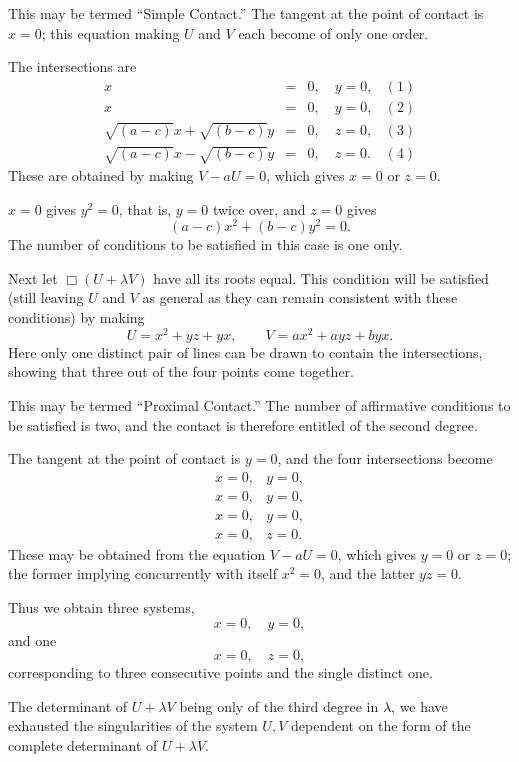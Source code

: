 \documentclass[11pt]{article}
\newcommand{\sourcepage}[1]{\marginpar{\scriptsize p.~#1}}
\begin{document}
{{\sourcepage{224}
This may be termed ``Simple Contact.'' The tangent at the point of contact is $x=0$; this equation making $U$ and $V$ each become of only one order.

The intersections are
\[
\begin{array}{rcll}
x&=&0,\quad y=0, &(1)\\
x&=&0,\quad y=0, &(2)\\
\sqrt{(a-c)}x+\sqrt{(b-c)}y&=&0,\quad z=0, &(3)\\
\sqrt{(a-c)}x-\sqrt{(b-c)}y&=&0,\quad z=0. &(4)
\end{array}
\]
These are obtained by making $V-aU=0$, which gives $x=0$ or $z=0$.

$x=0$ gives $y^2=0$, that is, $y=0$ twice over, and $z=0$ gives
\[
(a-c)x^2+(b-c)y^2=0.
\]
The number of conditions to be satisfied in this case is one only.

Next let $\Box(U+\lambda V)$ have all its roots equal. This condition will be satisfied (still leaving $U$ and $V$ as general as they can remain consistent with these conditions) by making
\[
U=x^2+yz+yx,
\qquad
V=ax^2+ayz+byx.
\]
Here only one distinct pair of lines can be drawn to contain the intersections, showing that three out of the four points come together.

This may be termed ``Proximal Contact.'' The number of affirmative conditions to be satisfied is two, and the contact is therefore entitled of the second degree.

The tangent at the point of contact is $y=0$, and the four intersections become
\[
\begin{array}{cc}
x=0,& y=0,\\
x=0,& y=0,\\
x=0,& y=0,\\
x=0,& z=0.
\end{array}
\]
These may be obtained from the equation $V-aU=0$, which gives $y=0$ or $z=0$; the former implying concurrently with itself $x^2=0$, and the latter $yz=0$.

Thus we obtain three systems,
\[
x=0,\quad y=0,
\]
and one
\[
x=0,\quad z=0,
\]
corresponding to three consecutive points and the single distinct one.

\sourcepage{225}
The determinant of $U+\lambda V$ being only of the third degree in $\lambda$, we have exhausted the singularities of the system $U,V$ dependent on the form of the complete determinant of $U+\lambda V$.

}}
\end{document}

